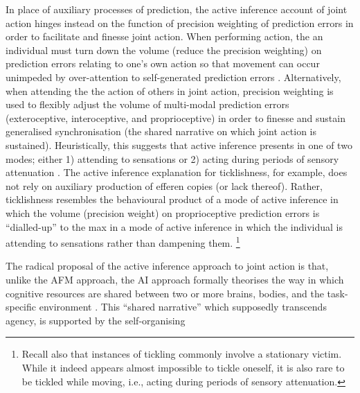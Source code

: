 \begin{CJK}{UTF8}{gbsn}
In place of auxiliary processes of prediction, the active inference account of joint action hinges instead on the function of precision weighting of prediction errors in order to facilitate and finesse joint action.  When performing action, the an individual must turn down the volume (reduce the precision weighting) on prediction errors relating to one's own action so that movement can occur unimpeded by over-attention to self-generated prediction errors \citep[an intuitive example of the opposite of this ideal scenario is when the flow of speech is interrupted due to the availability of exteroceptive auditory feedback in the case of a Skype call][]{Friston2015}. Alternatively, when attending the the action of others in joint action, precision weighting is used to flexibly adjust the volume of multi-modal prediction errors (exteroceptive, interoceptive, and proprioceptive) in order to finesse and sustain generalised synchronisation (the shared narrative on which joint action is sustained).  Heuristically, this suggests that active inference presents in one of two modes; either 1) attending to sensations or
2) acting during periods of sensory attenuation \citep{Friston2015}.  The active inference explanation for ticklishness, for example, does not rely on auxiliary production of efferen copies (or lack thereof).  Rather, ticklishness resembles the behavioural product of a mode of active inference in which the volume (precision weight) on proprioceptive prediction errors is ``dialled-up'' to the max in a mode of active inference in which the individual is attending to sensations rather than dampening them.
  \footnote{Recall also that instances of tickling commonly involve a stationary victim. While it indeed appears almost impossible to tickle oneself, it is also rare to be tickled while moving, i.e., acting during periods of sensory attenuation.}

The radical proposal of the active inference approach to joint action is that, unlike the AFM approach, the AI approach formally theorises the way in which cognitive resources are shared between two or more brains, bodies, and the task-specific environment \citep{Clark2015}.
This ``shared narrative'' which supposedly transcends agency, is supported by the self-organising



\end{CJK}
